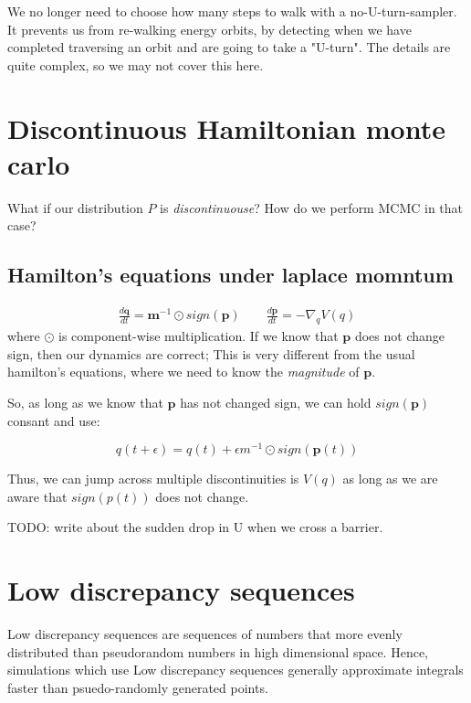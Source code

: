 \documentclass[titlepage]{article}
\newcommand{\p}{\mathbf{p}}
\newcommand{\q}{\mathbf{q}}
\newcommand{\m}{\mathbf{m}}
\begin{document}
We no longer need to choose how many steps to walk with a no-U-turn-sampler.
It prevents us from re-walking energy orbits, by detecting when we have completed
traversing an orbit and are going to take a "U-turn". The details are quite
complex, so we may not cover this here.

\section{Discontinuous Hamiltonian monte carlo}

What if our distribution $P$ is \emph{discontinuouse}? How do we perform MCMC
in that case?

\subsection{Hamilton's equations under laplace momntum}

\begin{align*}
    \frac{d \q}{dt} = \m^{-1} \odot sign(\p) \qquad \frac{d \p}{dt} = - \nabla_q V(q)
\end{align*}
where $\odot$ is component-wise multiplication. If we know that $\p$ does
not change sign, then our dynamics are correct; This is very different from
the usual hamilton's equations, where we need to know the \emph{magnitude}
of $\p$.

So, as long as we know that $\p$ has not changed sign, we can hold $sign(\p)$
consant and use:

$$
q(t + \epsilon) = q(t) + \epsilon m^{-1} \odot sign(\p(t))
$$

Thus, we can jump across multiple discontinuities is $V(q)$ as long as we are
aware that $sign(p(t))$ does not change.

TODO: write about the sudden drop in U when we cross a barrier.

\section{Low discrepancy sequences}
Low discrepancy sequences are sequences of numbers that more evenly
distributed than pseudorandom numbers in high dimensional space. Hence,
simulations which use Low discrepancy sequences generally approximate
integrals faster than psuedo-randomly generated points.
\end{document}

